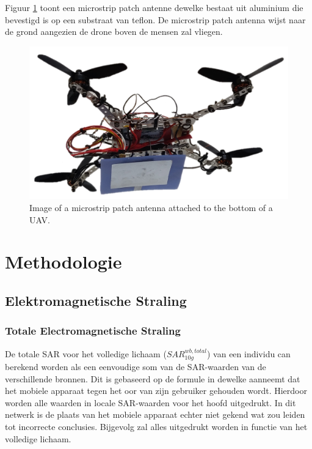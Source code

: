\documentclass[twocolumn]{phdsymp} %
\begin{document}
Figuur \ref{fig:exampleDrone} toont een microstrip patch antenne dewelke bestaat 
uit aluminium die bevestigd is op een substraat van teflon. De microstrip patch antenna 
wijst naar de grond aangezien de drone boven de mensen zal vliegen.

\begin{figure}[h]
\centering
  \includegraphics[width=\linewidth]{drone.png}
  \caption{Image of a microstrip patch antenna attached to the bottom of a \gls{UAV}. }
  \label{fig:exampleDrone}
\end{figure}

\section{Methodologie}
\subsection{Elektromagnetische Straling}
\subsubsection{Totale Electromagnetische Straling}
De totale \gls{SAR} voor het volledige lichaam ($SAR^{wb,total}_{10g}$) van een individu 
can berekend worden als een eenvoudige som van de \gls{SAR}-waarden van de verschillende bronnen. 
Dit is gebaseerd op de formule in \cite{J17_kuehn2019modelling} dewelke aanneemt dat het mobiele apparaat 
tegen het oor van zijn gebruiker gehouden wordt. Hierdoor worden alle waarden in locale \gls{SAR}-waarden voor het hoofd uitgedrukt.
In dit netwerk is de plaats van het mobiele apparaat echter  niet  gekend wat zou leiden tot incorrecte conclusies. Bijgevolg 
zal alles uitgedrukt worden in functie van het volledige lichaam.
\end{document}
